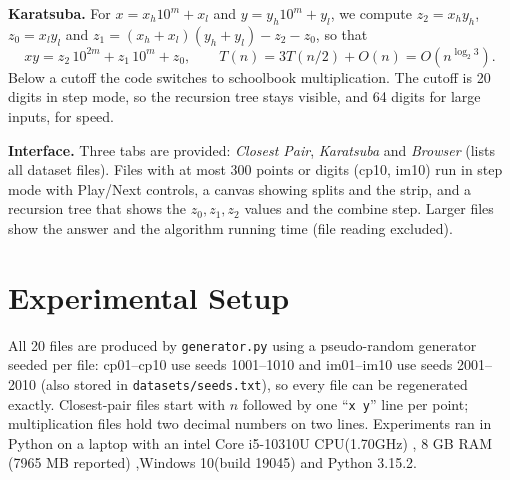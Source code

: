 \documentclass[10pt,a4paper]{article}
\begin{document}
\textbf{Karatsuba.} For $x=x_h10^m+x_l$ and $y=y_h10^m+y_l$, we compute $z_2=x_hy_h$, $z_0=x_ly_l$ and $z_1=(x_h+x_l)(y_h+y_l)-z_2-z_0$, so that
\begin{equation}
xy=z_2\,10^{2m}+z_1\,10^{m}+z_0,\qquad T(n)=3T(n/2)+O(n)=O(n^{\log_2 3}).
\end{equation}
Below a cutoff the code switches to schoolbook multiplication. The cutoff is 20 digits in step mode, so the recursion tree stays visible, and 64 digits for large inputs, for speed.

\textbf{Interface.} Three tabs are provided: \emph{Closest Pair}, \emph{Karatsuba} and \emph{Browser} (lists all dataset files). Files with at most 300 points or digits (cp10, im10) run in step mode with Play/Next controls, a canvas showing splits and the strip, and a recursion tree that shows the $z_0,z_1,z_2$ values and the combine step. Larger files show the answer and the algorithm running time (file reading excluded).

\section{Experimental Setup}
All 20 files are produced by \texttt{generator.py} using a pseudo-random generator seeded per file: cp01--cp10 use seeds 1001--1010 and im01--im10 use seeds 2001--2010 (also stored in \texttt{datasets/seeds.txt}), so every file can be regenerated exactly. Closest-pair files start with $n$ followed by one ``\texttt{x y}'' line per point; multiplication files hold two decimal numbers on two lines. Experiments ran in Python on a laptop with an intel Core i5-10310U CPU(1.70GHz) , 8 GB RAM (7965 MB reported) ,Windows 10(build 19045) and Python 3.15.2. 
\end{document}

